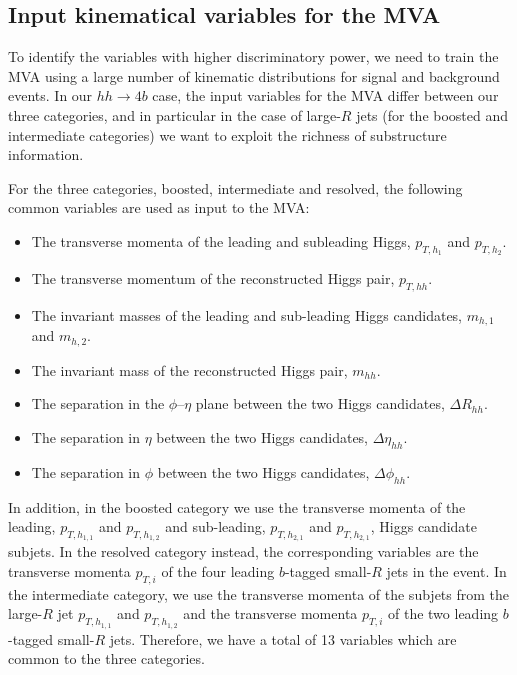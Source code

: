 

 \subsection{Input kinematical variables for the MVA}
 \label{sec:input}

 To identify the variables with higher discriminatory power,
 we need to train
 the MVA using a large number of kinematic distributions for
 signal and background events.
%
In our $hh\to 4b$ case,
the input variables for the MVA differ between our three categories,
and in particular in the case of large-$R$ jets (for the boosted
and intermediate categories) we want to exploit
the richness of substructure information.

For the three categories, boosted, intermediate and resolved,
the following common variables are used as input to the MVA:
\begin{itemize}
\item The transverse momenta of the leading and subleading Higgs, $p_{T,h_1}$ and $p_{T,h_2}$.
\item The transverse momentum of the reconstructed Higgs pair, $p_{T,hh}$.
\item The invariant masses of the leading and sub-leading Higgs candidates, $m_{h,1}$ and $m_{h,2}$.
\item The invariant mass of the reconstructed Higgs pair, $m_{hh}$.
\item The separation in the $\phi$--$\eta$ plane
  between the two Higgs candidates, $\Delta R_{hh}$.
  \item The separation in $\eta$  between the two Higgs candidates, $\Delta \eta_{hh}$.
\item The separation in $\phi$  between the two Higgs candidates, $\Delta \phi_{hh}$.
\end{itemize}
In addition, in the boosted category we use
  the transverse momenta of the leading, $p_{T,h_{1,1}}$ and $p_{T,h_{1,2}}$ and
  sub-leading, $p_{T,h_{2,1}}$ and $p_{T,h_{2,1}}$, Higgs candidate subjets.
  In the resolved category instead,
  the corresponding variables are
  the transverse momenta $p_{T,i}$ of the four leading 
  $b$-tagged small-$R$ jets in the event.
  In the intermediate category, we use the
  transverse momenta of the subjets
  from the large-$R$ jet $p_{T,h_{1,1}}$ and $p_{T,h_{1,2}}$ and the
 transverse momenta $p_{T,i}$ of the two leading 
  $b$-tagged small-$R$ jets.
Therefore, we have a total of 13 variables which are common to the three categories.
%



